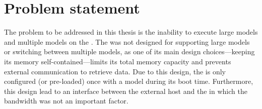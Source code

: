 \section{Problem statement}
The problem to be addressed in this thesis is the inability to execute large models and multiple models on the \graicore{}.
The \graicore{} was not designed for supporting large models or switching between multiple models, as one of its main design choices---keeping its memory self-contained---limits its total memory capacity and prevents external communication to retrieve data.
Due to this design, the \graicore{} is only configured (or pre-loaded) once with a model during its boot time.
Furthermore, this design lead to an interface between the external host and the \graicore{} in which the bandwidth was not an important factor.




